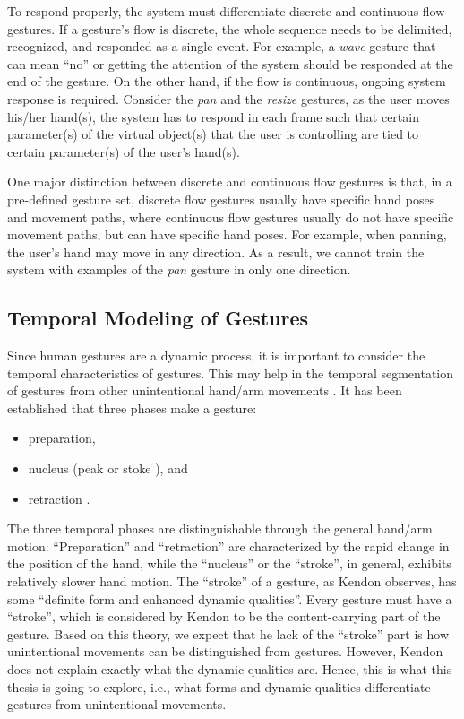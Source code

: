 To respond properly, the system must differentiate discrete and continuous
flow gestures. If a gesture's flow
is discrete, the whole sequence needs to be delimited, recognized, and responded
as a single event. For example, a \textit{wave} gesture that can mean ``no'' or getting the attention of the 
system should be responded at the end of the gesture. On the other hand, if the 
flow is continuous, ongoing system response is required. Consider the \textit{pan} and the \textit{resize} gestures, 
as the user moves his/her hand(s), the system has to respond in each frame such that
certain parameter(s) of the virtual object(s) that the user is controlling are tied to
certain parameter(s) of the user's hand(s).

One major distinction between discrete and continuous flow gestures is that,
in a pre-defined gesture set, discrete flow gestures usually have specific hand
poses and movement paths, where continuous flow gestures usually do not have
specific movement paths, but can have specific hand poses.
For example, when panning, the user's hand may move in any
direction. As a result, 
 we cannot train the system with examples of  the
\textit{pan} gesture in only one direction.

\subsection{Temporal Modeling of Gestures}
Since human gestures are a dynamic process, it is important to consider the
temporal characteristics of gestures. This may help in the temporal segmentation
of gestures from other unintentional hand/arm movements \cite{Pavlovic97}. It
has been established that three phases make a gesture:
\begin{itemize}
  \item preparation,
  \item nucleus (peak or stoke \cite{mcneill82}), and
  \item retraction \cite{Pavlovic97}.
\end{itemize}
The three temporal phases are distinguishable through the general hand/arm
motion: ``Preparation'' and ``retraction'' are characterized by the rapid change
in the position of the hand, while the ``nucleus'' or the ``stroke'', in
general, exhibits relatively slower hand motion. The ``stroke'' of a gesture, as
Kendon \cite{kendon86} observes, has some ``definite form and enhanced dynamic
qualities''. Every gesture must have a ``stroke'', which is considered by Kendon
to be the content-carrying part of the gesture. Based on this theory, we
expect that he lack of the ``stroke'' part is how unintentional movements can
be distinguished from gestures. However, Kendon does not explain exactly what
the dynamic qualities are. Hence, this is what this thesis is going to explore, i.e., what forms and dynamic qualities differentiate gestures from unintentional movements.

